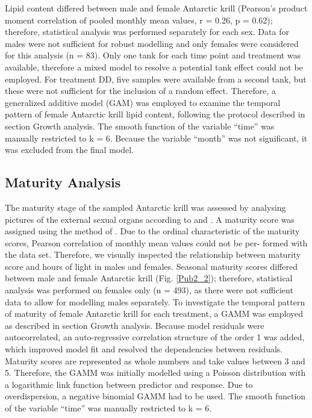Lipid content differed between male and female Antarctic krill (Pearson’s
product moment correlation of pooled monthly mean values, r = 0.26, p = 0.62);
therefore, statistical analysis was performed separately for each sex. Data for
males were not sufficient for robust modelling and only females were considered
for this analysis (n = 83). Only one tank for each time point and treatment was
available, therefore a mixed model to resolve a potential tank effect could not
be employed. For treatment DD, five samples were available from a second tank,
but these were not sufficient for the inclusion of a random effect. Therefore,
a generalized additive model (GAM) was employed to examine the temporal pattern
of female Antarctic krill lipid content, following the protocol described in
section Growth analysis. The smooth function of the variable “time” was
manually restricted to k = 6. Because the variable “month” was not significant,
it was excluded from the final model.

\subsection{Maturity Analysis}

The maturity stage of the sampled Antarctic krill was assessed by analysing
pictures of the external sexual organs according to \citet{makarov_stages_1980}
and \citet{thomas_thelycum_1987}. A maturity score was assigned using the
method of \citet{brown_temperature_2010, brown_flexible_2011}. Due to the
ordinal characteristic of the maturity scores, Pearson correlation of monthly
mean values could not be per- formed with the data set. Therefore, we visually
inspected the relationship between maturity score and hours of light in males
and females. Seasonal maturity scores differed between male and female
Antarctic krill (Fig. \ref{Pub2_2}); therefore, statistical analysis was
performed on females only (n = 493), as there were not sufficient data to allow
for modelling males separately. To investigate the temporal pattern of maturity
of female Antarctic krill for each treatment, a GAMM was employed as described
in section Growth analysis. Because model residuals were autocorrelated, an
auto-regressive correlation structure of the order 1 was added, which improved
model fit and resolved the dependencies between residuals. Maturity scores are
represented as whole numbers and take values between 3 and 5. Therefore, the
GAMM was initially modelled using a Poisson distribution with a logarithmic
link function between predictor and response. Due to overdispersion, a negative
binomial GAMM had to be used. The smooth function of the variable “time” was
manually restricted to k = 6. 


